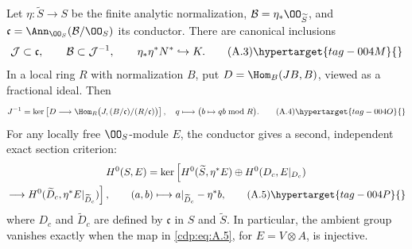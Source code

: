 \begin{proposition}\hypertarget{tag-01AG}{}\label{cdp:st:A.2.2}

\label{wbII:lem:conductor}\label{wbII:lem:conductor-square}
Let $\eta:\widetilde S\to S$ be the finite analytic normalization, $\mathcal B=\eta_*\OO_{\widetilde S}$, and $\mathfrak c=\Ann_{\OO_S}(\mathcal B/\OO_S)$ its conductor. There are canonical inclusions
\[
 \mathcal J\subset\mathfrak c,\qquad
 \mathcal B\subset\mathcal J^{-1},\qquad
 \eta_*\eta^*N^*\hookrightarrow K.
\tag{A.3}\hypertarget{tag-004M}{}\label{cdp:eq:A.3}
\]
In a local ring $R$ with normalization $B$, put $D=\Hom_B(JB,B)$, viewed as a fractional ideal. Then
\[
 J^{-1}=\ker\left[D\longrightarrow
 \Hom_R\bigl(J,(B/\mathfrak c)/(R/\mathfrak c)\bigr)\right],
\quad q\longmapsto\bigl(b\mapsto qb\bmod R\bigr).
\tag{A.4}\hypertarget{tag-004O}{}\label{cdp:eq:A.4}
\]
For any locally free $\OO_S$-module $E$, the conductor gives a second, independent exact section criterion:
\begin{multline}
H^0(S,E)=
\ker\left[H^0(\widetilde S,\eta^*E)\oplus H^0(D_c,E|_{D_c})\right.\\
\left.\longrightarrow H^0(\widetilde D_c,\eta^*E|_{\widetilde D_c})\right],
\qquad (a,b)\longmapsto a|_{\widetilde D_c}-\eta^*b,
\tag{A.5}\hypertarget{tag-004P}{}\label{cdp:eq:A.5}
\end{multline}
where $D_c$ and $\widetilde D_c$ are defined by $\mathfrak c$ in $S$ and $\widetilde S$. In particular, the ambient group vanishes exactly when the map in \eqref{cdp:eq:A.5}, for $E=V\otimes A$, is injective.
\end{proposition}
